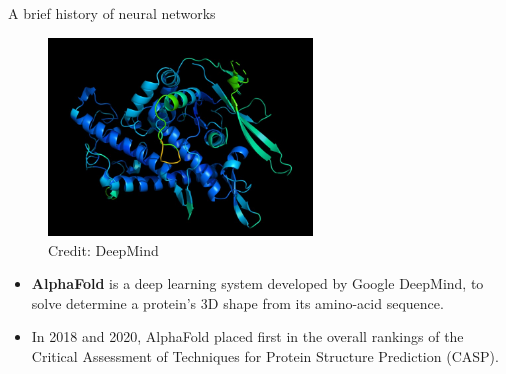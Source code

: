 \begin{vbframe}{A brief history of neural networks}
\begin{figure}
\centering
\includegraphics[width=7cm]{figure/alphafold.jpg}
\\
\tiny {Credit: DeepMind}
\end{figure}
\footnotesize
\begin{itemize}
\item\textbf{AlphaFold} is a deep learning system developed by Google DeepMind, to solve determine a protein's 3D shape from its amino-acid sequence.
\vspace{.1cm}
\item In 2018 and 2020, AlphaFold placed first in the overall rankings of the Critical Assessment of Techniques for Protein Structure Prediction (CASP).
\end{itemize}
\end{vbframe}

\endlecture
